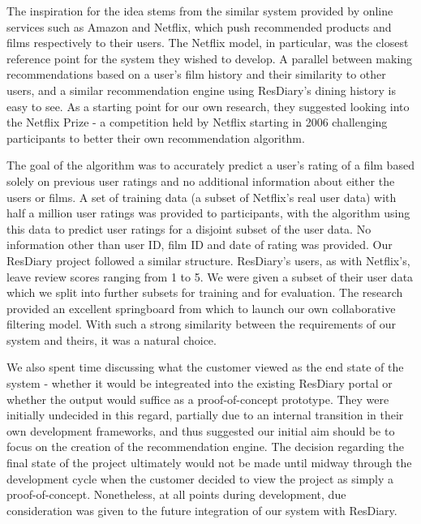 \documentclass{l3proj}
\begin{document}
The inspiration for the idea stems from the similar system provided by online services such as Amazon and Netflix, which push recommended products and films respectively to their users. The Netflix model, in particular, was the closest reference point for the system they wished to develop. A parallel between making recommendations based on a user's film history and their similarity to other users, and a similar recommendation engine using ResDiary's dining history is easy to see. As a starting point for our own research, they suggested looking into the Netflix Prize - a competition held by Netflix starting in 2006 challenging participants to better their own recommendation algorithm. 

The goal of the algorithm was to accurately predict a user's rating of a film based solely on previous user ratings and no additional information about either the users or films. A set of training data (a subset of Netflix's real user data) with half a million user ratings was provided to participants, with the algorithm using this data to predict user ratings for a disjoint subset of the user data. No information other than user ID, film ID and date of rating was provided. Our ResDiary project followed a similar structure. ResDiary's users, as with Netflix's, leave review scores ranging from 1 to 5. We were given a subset of their user data which we split into further subsets for training and for evaluation. The research provided an excellent springboard from which to launch our own collaborative filtering model. With such a strong similarity between the requirements of our system and theirs, it was a natural choice.


We also spent time discussing what the customer viewed as the end state of the system - whether it would be integreated into the existing ResDiary portal or whether the output would suffice as a proof-of-concept prototype. They were initially undecided in this regard, partially due to an internal transition in their own development frameworks, and thus suggested our initial aim should be to focus on the creation of the recommendation engine. The decision regarding the final state of the project ultimately would not be made until midway through the development cycle when the customer decided to view the project as simply a proof-of-concept. Nonetheless, at all points during development, due consideration was given to the future integration of our system with ResDiary. 
\end{document}
